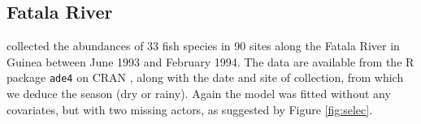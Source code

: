 
\subsection{Fatala River}
\cite{baran1995dynamique} collected the abundances of 33 fish species in 90 sites along the Fatala River in Guinea between June 1993 and February 1994. The data are available from the R package \texttt{ade4} on CRAN \citep{dray2007ade4}, along with the date and site of collection, from which we deduce the season (dry or rainy). Again the model was fitted without any covariates, but with two missing actors, as suggested by Figure \ref{fig:selec}. \\
